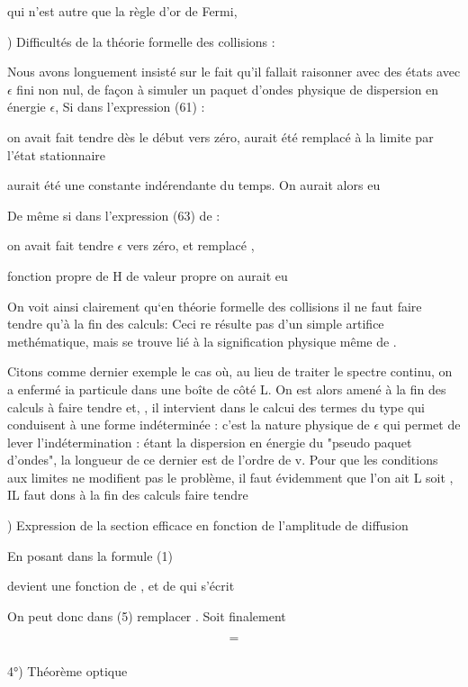 qui n'est autre que la règle d'or de Fermi,

) Difficultés de la théorie formelle des collisions :

Nous avons longuement insisté sur le fait qu'il fallait raisonner
avec des états  avec $\epsilon$ fini non nul, de façon à simuler un paquet
d'ondes physique de dispersion en énergie $\epsilon$, Si dans l'expression (61) :

on avait fait tendre dès le début  vers zéro, aurait été remplacé à la limite par
l'état stationnaire 

aurait été une constante indérendante du temps. On aurait alors eu 


De même si dans l'expression (63) de  :

on avait fait tendre $\epsilon$ vers zéro, et remplacé ,

fonction propre de H de valeur propre on aurait eu

On voit ainsi clairement qu‘en théorie formelle des collisions
il ne faut faire tendre  qu'à la fin des calculs: Ceci re résulte
pas d'un simple artifice methématique, mais se trouve lié à la signification
physique même de .

Citons comme dernier exemple le cas où, au lieu de traiter le
spectre continu, on a enfermé ia particule dans une boîte de côté L. On
est alors amené à la fin des calculs à faire tendre  et, , il
intervient dans le calcui des termes du type  qui conduisent à une forme
indéterminée : c'est la nature physique de $\epsilon$ qui permet de lever l'indétermination : 
étant la dispersion en énergie du "pseudo paquet d'ondes", la
longueur de ce dernier est de l'ordre de v. Pour que les conditions aux
limites ne modifient pas le problème, il faut évidemment que l'on ait L 
soit , IL faut dons à la fin des calculs faire tendre

) Expression de la section efficace en fonction de l'amplitude  de diffusion

En posant dans la formule (1)

 

devient une fonction de , et de  qui s'écrit

On peut donc dans (5) remplacer . Soit finalement

\[
\tag{73}=
\]

\subsubsection{}%
4°) Théorème optique

